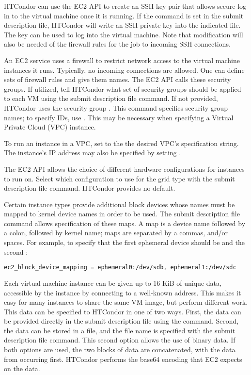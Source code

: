 HTCondor can use the EC2 API to create an SSH key pair that allows
secure log in to the virtual machine once it is running.
If the command
is set in the submit description file,
HTCondor will write an SSH private key into the indicated file.
The key can be used to log into the virtual machine.
Note that modification will also be needed of the firewall
rules for the job to incoming SSH connections.

An EC2 service uses a firewall to restrict network access to
the virtual machine instances it runs.
Typically, no incoming connections are allowed.
One can define sets of firewall rules and give them names.
The EC2 API calls these security groups.
If utilized, tell HTCondor what set of security
groups should be applied to each VM using the
 submit description file command.
If not provided, HTCondor uses the security group .
This command specifies security group names; to specify IDs, use
.  This may be necessary when specifying
a Virtual Private Cloud (VPC) instance.

To run an instance in a VPC, 
set  to the the desired VPC's specification string.
The instance's IP address 
may also be specified by setting .

The EC2 API allows the choice of different hardware configurations 
for instances to run on.
Select which configuration to use for the  grid type
with the  submit description file command.
HTCondor provides no default.

Certain instance types provide additional block devices whose names must be
mapped to kernel device names in order to be used.
The  submit description file command
allows specification of these maps.  
A map is a device name followed by a
colon, followed by kernel name; 
maps are separated by a commas, and/or spaces.
For example, 
to specify that the first ephemeral device should be 
and the second :

\begin{verbatim}
ec2_block_device_mapping = ephemeral0:/dev/sdb, ephemeral1:/dev/sdc
\end{verbatim}

Each virtual machine instance can be given up to 16 KiB of unique data, 
accessible by the instance by connecting to a well-known address.
This makes it easy for many instances to share the same VM image,
but perform different work.
This data can be specified to HTCondor in one of two ways.
First, the data can be provided directly in the submit description file 
using the  command.
Second, the data can be
stored in a file, and the file name is specified with the
 submit description file command.
This second option allows the use of binary data.
If both options are used, the two blocks of
data are concatenated, with the data from  
occurring first.  HTCondor performs the base64 encoding that EC2 expects on 
the data.

